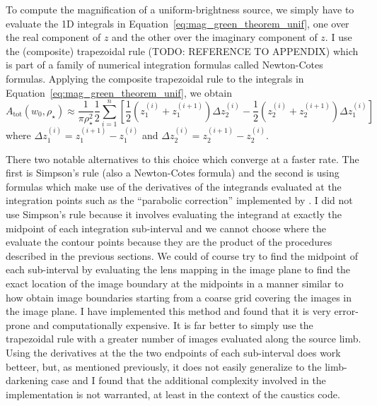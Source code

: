 \documentclass[12pt,dvipsnames]{report}
\newcommand{\ssf}[1]{\textsf{#1}}
\begin{document}
To compute the magnification of a uniform-brightness source, we simply have to evaluate the 1D 
integrals in Equation~\ref{eq:mag_green_theorem_unif}, one over the real component of $z$
and the other over the imaginary component of $z$. 
I use the (composite) \ssf{trapezoidal rule} (TODO: REFERENCE TO APPENDIX) which is part of 
a family of numerical integration formulas called \ssf{Newton-Cotes formulas}. 
Applying the composite trapezoidal rule to the integrals in Equation~\ref{eq:mag_green_theorem_unif},
we obtain
\begin{equation}
    A_\mathrm{tot}\left(w_0, \rho_{\star}\right)\approx  \frac{1}{ \pi \rho_{\star}^{2}}
    \frac{1}{2}\sum_{i=1}^{n}\left[\frac{1}{2}\left(z_1^{(i)}+z_1^{(i+1)}\right)\Delta z_2^{(i)}
    -\frac{1}{2}\left(z_2^{(i)}+z_2^{(i+1)}\right)\Delta z_1^{(i)}\right]
\label{eq:mag_trapezoidal}
\end{equation}
where $\Delta z_1^{(i)}= z_1^{(i+1)}-z_1^{(i)}$ and $\Delta z_2^{(i)}= z_2^{(i+1)}-z_2^{(i)}$.


There two notable alternatives to this choice which converge at a faster rate. The first 
is \ssf{Simpson's rule}
(also a Newton-Cotes formula) and the second is using formulas which make use of the derivatives 
of the integrands evaluated at the integration points such as the ``parabolic correction''
implemented by \citet{2010MNRAS.408.2188B}. I did not use Simpson's rule because it involves 
evaluating the integrand at exactly the midpoint of each integration sub-interval and we cannot 
choose where the evaluate the contour points because they are the product of the procedures 
described in the previous sections. We could of course try to find the midpoint of each 
sub-interval by evaluating the lens mapping in the image plane to find the exact location of the 
image boundary at the midpoints in a manner similar to how \citet{2010ApJ...716.1408B} obtain 
image boundaries starting from a coarse grid covering the images in the image plane. I have 
implemented this method and found that it is very error-prone and computationally expensive. It 
is far better to simply use the trapezoidal rule with a greater number of images evaluated 
along the source limb.  Using the derivatives at the the two endpoints of each sub-interval 
does work betteer, but, as mentioned previously, it does not easily generalize to the 
limb-darkening case and I found that the additional complexity involved in the implementation 
is not warranted, at least in the context of the \ssf{caustics} code.
\end{document}
